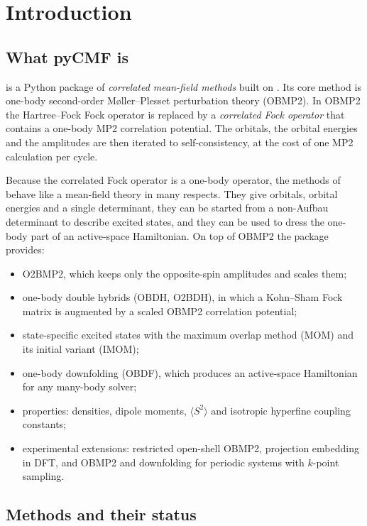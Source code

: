 \chapter{Introduction}
\label{ch:intro}

\section{What pyCMF is}

\pycmf{} is a Python package of \emph{correlated mean-field methods} built on
\pyscf{}. Its core method is one-body second-order M\o ller--Plesset
perturbation theory (OBMP2). In OBMP2 the Hartree--Fock Fock operator is
replaced by a \emph{correlated Fock operator} that contains a one-body MP2
correlation potential. The orbitals, the orbital energies and the amplitudes
are then iterated to self-consistency, at the cost of one MP2 calculation per
cycle.

Because the correlated Fock operator is a one-body operator, the methods of
\pycmf{} behave like a mean-field theory in many respects. They give orbitals,
orbital energies and a single determinant, they can be started from a
non-Aufbau determinant to describe excited states, and they can be used to
dress the one-body part of an active-space Hamiltonian. On top of OBMP2 the
package provides:

\begin{itemize}
  \item O2BMP2, which keeps only the opposite-spin amplitudes and scales them;
  \item one-body double hybrids (OBDH, O2BDH), in which a Kohn--Sham Fock
        matrix is augmented by a scaled OBMP2 correlation potential;
  \item state-specific excited states with the maximum overlap method (MOM)
        and its initial variant (IMOM);
  \item one-body downfolding (OBDF), which produces an active-space
        Hamiltonian for any many-body solver;
  \item properties: densities, dipole moments, $\langle S^2\rangle$ and
        isotropic hyperfine coupling constants;
  \item experimental extensions: restricted open-shell OBMP2, projection
        embedding in DFT, and OBMP2 and downfolding for periodic systems with
        $k$-point sampling.
\end{itemize}

\section{Methods and their status}

